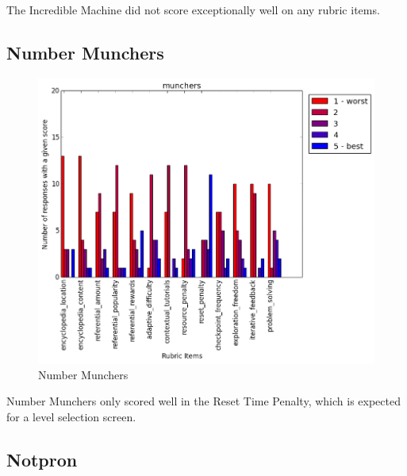 				The Incredible Machine did not score exceptionally well on any rubric items.

			\subsection{Number Munchers}

				\begin{figure}[] 
				\centering 
				\includegraphics[width=\textwidth, height=.4\textheight, keepaspectratio=true]{munchers_scores.png} 
				\caption{Number Munchers}
				\end{figure}

				Number Munchers only scored well in the Reset Time Penalty, which is expected for a level selection screen.

			\subsection{Notpron}

